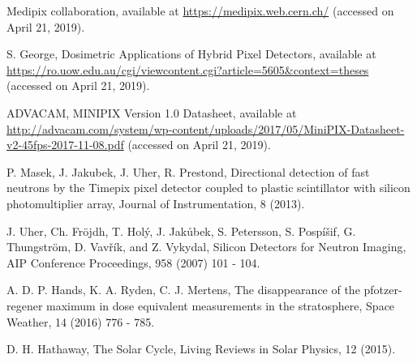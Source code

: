 \begin{thebibliography}{00}
  Medipix collaboration, available at \url{https://medipix.web.cern.ch/} (accessed on April 21, 2019).
  
  S. George, Dosimetric Applications of Hybrid Pixel Detectors, available at \url{https://ro.uow.edu.au/cgi/viewcontent.cgi?article=5605&context=theses} (accessed on April 21, 2019).

  ADVACAM, MINIPIX Version 1.0 Datasheet, available at \url{http://advacam.com/system/wp-content/uploads/2017/05/MiniPIX-Datasheet-v2-45fps-2017-11-08.pdf} (accessed on April 21, 2019).  

  P. Masek, J. Jakubek, J. Uher, R. Prestond, Directional detection of fast neutrons by the Timepix pixel detector coupled to plastic scintillator with silicon photomultiplier array, Journal of Instrumentation, 8 (2013).

  J. Uher, Ch. Fröjdh, T. Holý, J. Jakůbek, S. Petersson, S. Pospíšif, G. Thungström, D. Vavřík, and Z. Vykydal, Silicon Detectors for Neutron Imaging, AIP Conference Proceedings, 958 (2007) 101 - 104.

  A. D. P. Hands, K. A. Ryden, C. J. Mertens, The disappearance of the pfotzer-regener maximum in dose equivalent measurements in the stratosphere, Space Weather, 14 (2016) 776 - 785.
  
  D. H. Hathaway, The Solar Cycle, Living Reviews in Solar Physics, 12 (2015).

\end{thebibliography}
%
%
%
%
%
%
%

